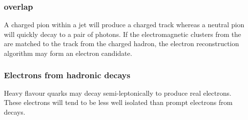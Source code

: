\subsubsection{\HepProcess{\Ppipm \Ppizero} overlap}
A charged pion within a jet will produce a charged track whereas a neutral pion
will quickly decay to a pair of photons. If the electromagnetic clusters from
the \Ppizero are matched to the track from the charged hadron, the electron
reconstruction algorithm may form an electron candidate\cite{nikos}.

\subsubsection{Electrons from hadronic decays}
Heavy flavour quarks may decay semi-leptonically to produce real electrons. These
electrons will tend to be less well isolated than prompt electrons from \PW
decays\cite{nikos}.

